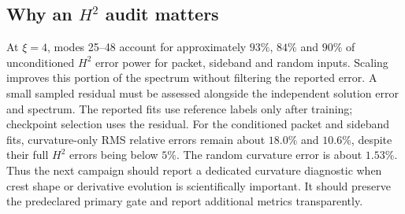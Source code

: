 \subsection{Why an $H^2$ audit matters}
At $\xi=4$, modes 25--48 account for approximately $93\%$, $84\%$ and $90\%$ of unconditioned $H^2$ error power for packet, sideband and random inputs. Scaling improves this portion of the spectrum without filtering the reported error.
A small sampled residual must be assessed alongside the independent solution error and spectrum. The reported fits use reference labels only after training; checkpoint selection uses the residual.
For the conditioned packet and sideband fits, curvature-only RMS relative errors remain about $18.0\%$ and $10.6\%$, despite their full $H^2$ errors being below $5\%$. The random curvature error is about $1.53\%$. Thus the next campaign should report a dedicated curvature diagnostic when crest shape or derivative evolution is scientifically important. It should preserve the predeclared primary gate and report additional metrics transparently.
